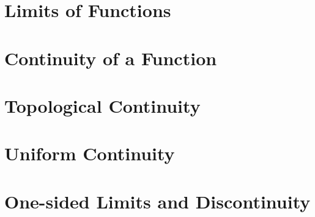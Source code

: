 \documentclass[a4paper, openany]{book}
\begin{document}
\section{Limits of Functions}

\newpage

\section{Continuity of a Function}

\newpage

\section{Topological Continuity}

\newpage

\section{Uniform Continuity}

\newpage

\section{One-sided Limits and Discontinuity}

\newpage
\end{document}

